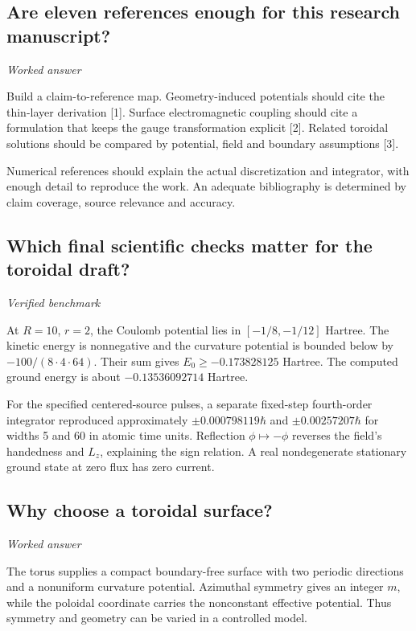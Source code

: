 \documentclass[11pt]{article}
\begin{document}
\subsection{Are eleven references enough for this research manuscript?}
\label{problem:torus-references}
\textit{Worked answer}

Build a claim-to-reference map. Geometry-induced potentials should cite the thin-layer derivation [1]. Surface electromagnetic coupling should cite a formulation that keeps the gauge transformation explicit [2]. Related toroidal solutions should be compared by potential, field and boundary assumptions [3].

Numerical references should explain the actual discretization and integrator, with enough detail to reproduce the work. An adequate bibliography is determined by claim coverage, source relevance and accuracy.

\subsection{Which final scientific checks matter for the toroidal draft?}
\label{problem:torus-final-check}
\textit{Verified benchmark}

At \(R=10\), \(r=2\), the Coulomb potential lies in \([-1/8,-1/12]\) Hartree. The kinetic energy is nonnegative and the curvature potential is bounded below by \(-100/(8\cdot4\cdot64)\). Their sum gives \(E_0\ge-0.173828125\) Hartree. The computed ground energy is about \(-0.13536092714\) Hartree.

For the specified centered-source pulses, a separate fixed-step fourth-order integrator reproduced approximately \(\pm0.000798119\hbar\) and \(\pm0.00257207\hbar\) for widths 5 and 60 in atomic time units. Reflection \(\phi\mapsto-\phi\) reverses the field's handedness and \(L_z\), explaining the sign relation. A real nondegenerate stationary ground state at zero flux has zero current.

\subsection{Why choose a toroidal surface?}
\label{problem:torus-motivation}
\textit{Worked answer}

The torus supplies a compact boundary-free surface with two periodic directions and a nonuniform curvature potential. Azimuthal symmetry gives an integer \(m\), while the poloidal coordinate carries the nonconstant effective potential. Thus symmetry and geometry can be varied in a controlled model.
\end{document}
